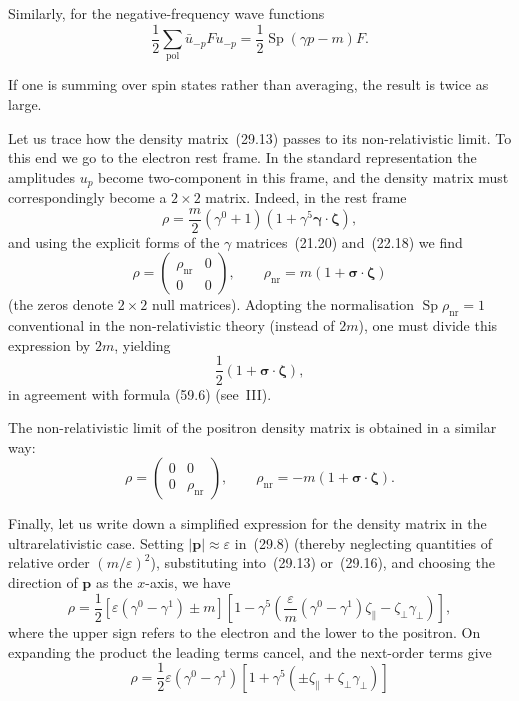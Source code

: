 Similarly, for the negative-frequency wave functions
\begin{equation}
\frac{1}{2}\sum_{\text{pol}}\bar u_{-p}Fu_{-p} = \frac{1}{2}\operatorname{Sp}(\gamma p - m)F.
\tag{29.19}
\end{equation}

If one is summing over spin states rather than averaging, the result is twice as large.

Let us trace how the density matrix~(29.13) passes to its non-relativistic limit. To this end we go to the electron rest frame. In the standard representation the amplitudes $u_p$ become two-component in this frame, and the density matrix must correspondingly become a $2 \times 2$ matrix. Indeed, in the rest frame
\[
\rho = \frac{m}{2}(\gamma^0 + 1)(1 + \gamma^5\boldsymbol{\gamma}\cdot\boldsymbol{\zeta}),
\]
and using the explicit forms of the $\gamma$ matrices~(21.20) and~(22.18) we find
\begin{equation}
\rho = \begin{pmatrix} \rho_{\text{nr}} & 0\\ 0 & 0 \end{pmatrix},\qquad \rho_{\text{nr}} = m(1 + \boldsymbol{\sigma}\cdot\boldsymbol{\zeta})
\tag{29.20}
\end{equation}
(the zeros denote $2 \times 2$ null matrices). Adopting the normalisation $\operatorname{Sp}\rho_{\text{nr}} = 1$ conventional in the non-relativistic theory (instead of $2m$), one must divide this expression by $2m$, yielding
\[
\frac{1}{2}(1 + \boldsymbol{\sigma}\cdot\boldsymbol{\zeta}),
\]
in agreement with formula (59.6) (see~III).

The non-relativistic limit of the positron density matrix is obtained in a similar way:
\[
\rho = \begin{pmatrix} 0 & 0\\ 0 & \rho_{\text{nr}} \end{pmatrix},\qquad \rho_{\text{nr}} = -m(1 + \boldsymbol{\sigma}\cdot\boldsymbol{\zeta}).
\]

Finally, let us write down a simplified expression for the density matrix in the ultrarelativistic case. Setting $|\mathbf{p}| \approx \varepsilon$ in~(29.8) (thereby neglecting quantities of relative order $(m/\varepsilon)^2$), substituting into~(29.13) or~(29.16), and choosing the direction of $\mathbf{p}$ as the $x$-axis, we have
\[
\rho = \frac{1}{2}[\varepsilon(\gamma^0 - \gamma^1) \pm m]\left[1 - \gamma^5\left(\frac{\varepsilon}{m}(\gamma^0 - \gamma^1)\zeta_\| - \zeta_\perp\gamma_\perp\right)\right],
\]
where the upper sign refers to the electron and the lower to the positron. On expanding the product the leading terms cancel, and the next-order terms give
\[
\rho = \frac{1}{2}\varepsilon(\gamma^0 - \gamma^1)[1 + \gamma^5(\pm\zeta_\| + \zeta_\perp\gamma_\perp)]
\]

